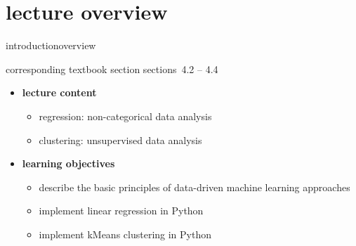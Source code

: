 


\subtitle{module 4.2: regression \& clustering}


	

    \section[overview]{lecture overview}
        \begin{frame}{introduction}{overview}
            \begin{block}{corresponding textbook section}
                    sections~4.2 -- 4.4
            \end{block}

            \begin{itemize}
                \item   \textbf{lecture content}
                    \begin{itemize}
                        \item   regression: non-categorical data analysis
                        \item   clustering: unsupervised data analysis
                    \end{itemize}
                \bigskip
                \item<2->   \textbf{learning objectives}
                    \begin{itemize}
                        \item   describe the basic principles of data-driven machine learning approaches
                        \item   implement linear regression in Python
                        \item   implement kMeans clustering in Python 
                    \end{itemize}
            \end{itemize}
        \end{frame}

